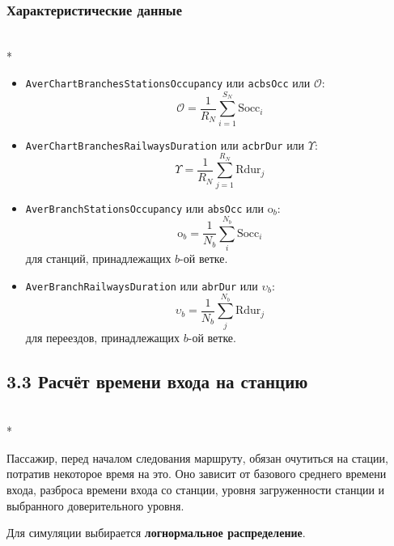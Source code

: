 \documentclass[12pt]{article}
\begin{document}
\subsubsection*{Характеристические данные}\mbox{}\\*

\begin{itemize}
  \item \texttt{AverChartBranchesStationsOccupancy} или \texttt{acbsOcc} или $\mathcal{O}$:
    \begin{equation}
      \mathcal{O} = \frac{1}{R_N} \sum_{i=1}^{S_N} \text{Socc}_i
      \label{eq:characteristic:acbsOcc}
    \end{equation}
  \item \texttt{AverChartBranchesRailwaysDuration} или \texttt{acbrDur} или $\Upsilon$:
    \begin{equation}
      \Upsilon = \frac{1}{R_N} \sum_{j=1}^{R_N} \text{Rdur}_j
      \label{eq:characteristic:acbrDur}
    \end{equation}
  \item \texttt{AverBranchStationsOccupancy} или \texttt{absOcc} или $\mathrm{o}_b$:
    \begin{equation}
      \mathrm{o}_b = \frac{1}{N_b} \sum_{i}^{N_b} \text{Socc}_i
      \label{eq:characteristic:absOcc}
    \end{equation}
    для станций, принадлежащих $b$-ой ветке.
  \item \texttt{AverBranchRailwaysDuration} или \texttt{abrDur} или $\upsilon_b$:
    \begin{equation}
      \upsilon_b = \frac{1}{N_b} \sum_{j}^{N_b} \text{Rdur}_j
      \label{eq:characteristic:abrDur}
    \end{equation}
    для переездов, принадлежащих $b$-ой ветке.
\end{itemize}

\subsection*{3.3 Расчёт времени входа на станцию}\mbox{}\\*

Пассажир, перед началом следования маршруту, обязан очутиться на стации, потратив некоторое время на это.
Оно зависит от базового среднего времени входа, разброса времени входа со станции,
уровня загруженности станции и выбранного доверительного уровня.

Для симуляции выбирается \textbf{логнормальное распределение}.
\end{document}
